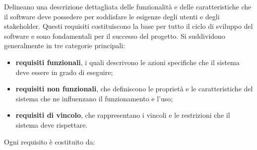 \newpage
{}
Delineano una descrizione dettagliata delle funzionalità e delle caratteristiche che il software deve possedere per soddisfare le esigenze degli utenti e degli stakeholder. Questi requisiti costituiscono la base per tutto il ciclo di sviluppo del software e sono fondamentali per il successo del progetto. Si suddividono generalmente in tre categorie principali: 
\begin{itemize}
	\item \textbf{requisiti funzionali}, i quali descrivono le azioni specifiche che il sistema deve essere in grado di eseguire;
	\item \textbf{requisiti non funzionali}, che definiscono le proprietà e le caratteristiche del sistema che ne influenzano il funzionamento e l'uso;
	\item \textbf{requisiti di vincolo}, che rappresentano i vincoli e le restrizioni che il sistema deve rispettare.
\end{itemize}
Ogni requisito è costituito da:

